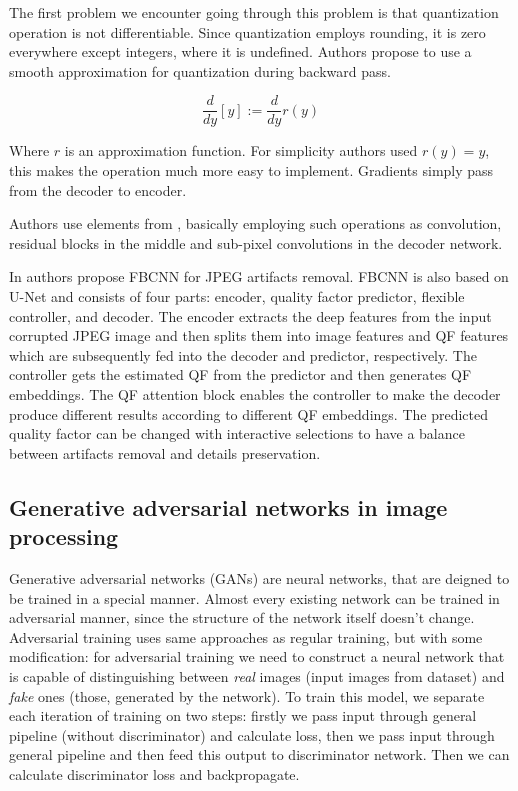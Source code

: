 The first problem we encounter going through this problem is that quantization operation is not differentiable. Since quantization employs rounding, it is zero everywhere except integers, where it is undefined. Authors propose to use a smooth approximation for quantization during backward pass.

\begin{equation}
    \label{eq:quantization}
    \frac{d}{dy}[y]:=\frac{d}{dy}r(y)
\end{equation}

Where $r$ is an approximation function. For simplicity authors used $r(y)=y$, this makes the operation much more easy to implement. Gradients simply pass from the decoder to encoder.

Authors use elements from \cite{shi_real-time_2016}, basically employing such operations as convolution, residual blocks in the middle and sub-pixel convolutions in the decoder network.

In \cite{jiang_towards_2021} authors propose FBCNN for JPEG artifacts removal. FBCNN is also based on U-Net \cite{ronneberger_u-net_2015} and consists of four parts: encoder, quality factor predictor, flexible controller, and decoder. The encoder extracts the deep features from the input corrupted JPEG image and then splits them into image features and QF features which are subsequently fed into the decoder and predictor, respectively. The controller gets the estimated QF from the predictor and then generates QF embeddings. The QF attention block enables the controller to make the decoder produce different results according to different QF embeddings. The predicted quality factor can be changed with interactive selections to have a balance between artifacts removal and details preservation.

\subsection{Generative adversarial networks in image processing}

Generative adversarial networks (GANs) are neural networks, that are deigned to be trained in a special manner. Almost every existing network can be trained in adversarial manner, since the structure of the network itself doesn't change. Adversarial training uses same approaches as regular training, but with some modification: for adversarial training we need to construct a neural network that is capable of distinguishing between \textit{real} images (input images from dataset) and \textit{fake} ones (those, generated by the network). To train this model, we separate each iteration of training on two steps: firstly we pass input through general pipeline (without discriminator) and calculate loss, then we pass input through general pipeline and then feed this output to discriminator network. Then we can calculate discriminator loss and backpropagate.

